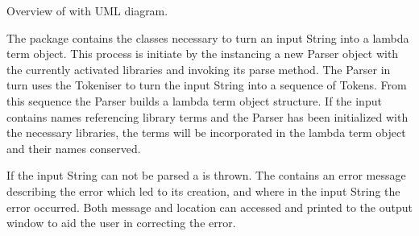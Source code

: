 Overview of \texttt{\pkg} with UML diagram.

The \texttt{} package contains the classes necessary to turn an input String into a lambda term object.
This process is initiate by the {} instancing a new Parser object with the currently activated libraries and invoking its parse method. 
The Parser in turn uses the Tokeniser to turn the input String into a sequence of Tokens. From this sequence the Parser builds a lambda term object structure.
If the input contains names referencing library terms and the Parser has been initialized with the necessary libraries, the terms will be incorporated in the lambda term object and their names conserved.
 
If the input String can not be parsed a {} is thrown.
The {} contains an error message describing the error which led to its creation, and where in the input String the error occurred.
Both message and location can accessed and printed to the output window to aid the user in correcting the error.
